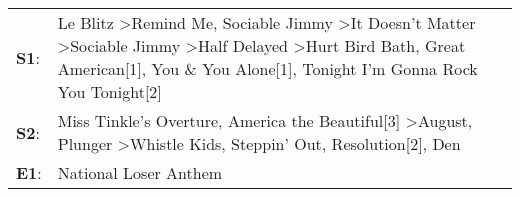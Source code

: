 \begin{supertabular}{p{0.03\textwidth}p{0.92\textwidth}}
 \textbf{S1}:  &  Le Blitz\textsuperscript{} \textgreater \enspace Remind Me\textsuperscript{}, \enspace Sociable Jimmy\textsuperscript{} \textgreater \enspace It Doesn't Matter\textsuperscript{} \textgreater \enspace Sociable Jimmy\textsuperscript{} \textgreater \enspace Half Delayed\textsuperscript{} \textgreater \enspace Hurt Bird Bath\textsuperscript{}, \enspace Great American[1]\textsuperscript{}, \enspace You \& You Alone[1]\textsuperscript{}, \enspace Tonight I'm Gonna Rock You Tonight[2]\textsuperscript{}  \enspace  \\
 \textbf{S2}:  &                                                                                                                                                              Miss Tinkle's Overture\textsuperscript{}, \enspace America the Beautiful[3]\textsuperscript{} \textgreater \enspace August\textsuperscript{}, \enspace Plunger\textsuperscript{} \textgreater \enspace Whistle Kids\textsuperscript{}, \enspace Steppin' Out\textsuperscript{}, \enspace Resolution[2]\textsuperscript{}, \enspace Den\textsuperscript{}  \enspace  \\
 \textbf{E1}:  &                                                                                                                                                                                                                                                                                                                                                                                                                                                                               National Loser Anthem\textsuperscript{}  \enspace  \\
\end{supertabular}
